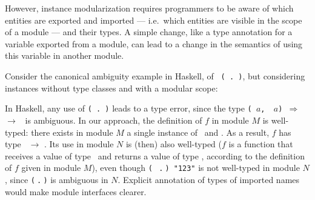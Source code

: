 However, instance modularization requires programmers to be aware of
which entities are exported and imported --- i.e.~which entities are
visible in the scope of a module --- and their types.  A simple
change, like a type annotation for a variable exported from a module,
can lead to a change in the semantics of using this variable in
another module.

Consider the canonical ambiguity example in Haskell, of {\tt
  (\sshow\ $\!$.$\!$ \rread)}, but considering instances without type
classes and with a modular scope:


In Haskell, any use of {\tt (\sshow\ $\!$.$\!$ \rread)} leads to a
type error, since the type {\tt (\SShow\ $a$, \RRead\ $a$)
  $\Rightarrow$ \String $\rightarrow$ \String} is ambiguous. In our
approach, the definition of $f$ in module $M$ is well-typed: there
exists in module $M$ a single instance of \myshow\ and \myread. As a
result, $f$ has type \String\ $\rightarrow$ \String. Its use in module
$N$ is (then) also well-typed ($f$ is a function that receives a value
of type \String\ and returns a value of type \String, according to the
definition of $f$ given in module $M$), even though {\tt (\myshow
  $\:$.$\:$\myread)\ "123"} is not well-typed in module $N$, since
{\tt (\myshow $\:$.$\:$\myread)} is ambiguous in $N$. Explicit
annotation of types of imported names would make module interfaces
clearer.



